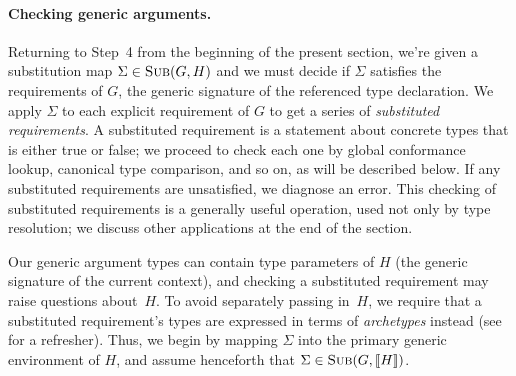 \documentclass[../generics]{subfiles}
\begin{document}
\paragraph{Checking generic arguments.}
Returning to Step~4 from the beginning of the present section, we're given a substitution map $\Sigma\in\textsc{Sub}({G, H})$ and we must decide if $\Sigma$ satisfies the requirements of $G$, the generic signature of the referenced type declaration. We apply $\Sigma$ to each explicit requirement of $G$ to get a series of \emph{substituted requirements}. A substituted requirement is a statement about concrete types that is either true or false; we proceed to check each one by global conformance lookup, canonical type comparison, and so on, as will be described below. If any substituted requirements are unsatisfied, we diagnose an error. This checking of substituted requirements is a generally useful operation, used not only by type resolution; we discuss other applications at the end of the section.

Our generic argument types can contain type parameters of $H$ (the generic signature of the current context), and checking a substituted requirement may raise questions about~$H$. To avoid separately passing in~$H$, we require that a substituted requirement's types are expressed in terms of \emph{archetypes} instead (see  for a refresher). Thus, we begin by mapping $\Sigma$ into the primary generic environment of $H$, and assume henceforth that $\Sigma\in\textsc{Sub}({G, [\![H]\!]})$.
\end{document}
